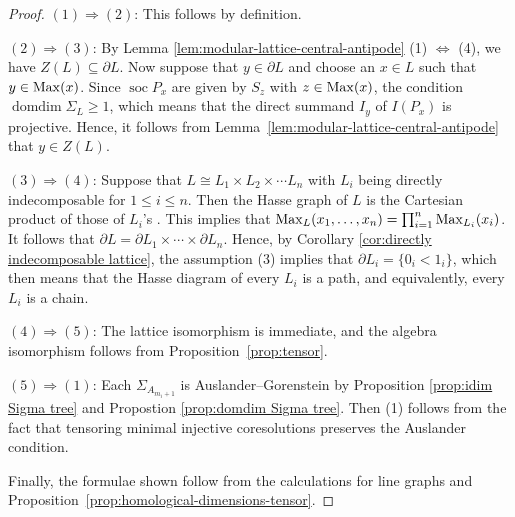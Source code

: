 \documentclass[a4paper,leqno]{amsart}
\begin{document}
\begin{proof}
$(1)\Rightarrow(2)$: This follows by definition. 

$(2)\Rightarrow(3)$:  By Lemma \ref{lem:modular-lattice-central-antipode} (1) $\Leftrightarrow$ (4), we have $Z(L)\subseteq \partial L$.
Now suppose that $y\in\partial L$ and choose an $x\in L$ such that $y\in\operatorname{Max}(x)$. 
Since $\operatorname{soc} P_x$ are given by $S_z$ with $z\in \operatorname{Max}(x)$, the condition $\operatorname{domdim}\Sigma_L\geq1$, which means that the direct summand $I_y$ of $I(P_x)$ is projective. 
Hence, it follows from Lemma~\ref{lem:modular-lattice-central-antipode} that $y \in Z(L)$.

$(3)\Rightarrow(4)$:  
Suppose that $L\cong L_1\times L_2\times \cdots L_n$ with $L_i$ being directly indecomposable for $1\le i\le n$.  Then the Hasse graph of $L$ is the Cartesian product of those of $L_i$'s .  This implies that 
$\operatorname{Max}_L(x_1,\ldots,x_n)=\prod_{i=1}^n\operatorname{Max}_{L_i}(x_i)$. 
It follows that $\partial L=\partial L_1\times\cdots\times\partial L_n$.
Hence, by Corollary \ref{cor:directly indecomposable lattice}, the assumption (3) implies that $\partial L_i=\{ 0_i < 1_i \}$, which then means that the Hasse diagram of every $L_i$ is a path, and equivalently, every $L_i$ is a chain. 

$(4)\Rightarrow(5)$: The lattice isomorphism is immediate, and the algebra isomorphism follows from Proposition~\ref{prop:tensor}. 

$(5)\Rightarrow(1)$: Each $\Sigma_{A_{m_i+1}}$ is Auslander--Gorenstein by Proposition \ref{prop:idim Sigma tree} and Propostion \ref{prop:domdim Sigma tree}.  Then (1) follows from the fact that tensoring minimal injective coresolutions preserves the Auslander condition.

Finally, the formulae shown follow from the calculations for line graphs and Proposition~\ref{prop:homological-dimensions-tensor}.
\end{proof}
\end{document}
